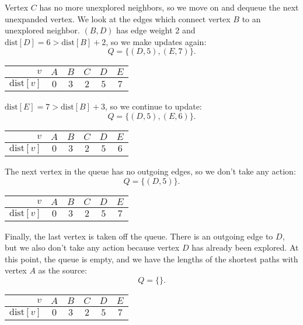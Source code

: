 \documentclass[11pt]{article}
\begin{document}
Vertex $C$ has no more unexplored neighbors, so we move on and dequeue the next unexpanded vertex. We look at the edges which connect vertex $B$ to an unexplored neighbor. $(B, D)$ has edge weight $2$ and $\text{dist}[D] = 6 > \text{dist}[B] + 2$, so we make updates again:
\begin{equation*}
    Q = \{(D, 5), (E, 7)\}.
\end{equation*}
\begin{center}
    \begin{tabular}{|r|ccccc|}
        \hline 
        $v$ & $A$ & $B$ & $C$ & $D$ & $E$ \\ \hline 
        $\text{dist}[v]$ & $0$ & $3$ & $2$ & $5$ & $7$ \\ \hline 
    \end{tabular}
\end{center}

$\text{dist}[E] = 7 > \text{dist}[B] + 3$, so we continue to update: 
\begin{equation*}
    Q = \{ (D, 5), (E, 6)\}.
\end{equation*}
\begin{center}
    \begin{tabular}{|r|ccccc|}
        \hline 
        $v$ & $A$ & $B$ & $C$ & $D$ & $E$ \\ \hline 
        $\text{dist}[v]$ & $0$ & $3$ & $2$ & $5$ & $6$ \\ \hline 
    \end{tabular}
\end{center}
The next vertex in the queue has no outgoing edges, so we don't take any action:
\begin{equation*}
    Q = \{ (D, 5)\}.
\end{equation*}
\begin{center}
    \begin{tabular}{|r|ccccc|}
        \hline 
        $v$ & $A$ & $B$ & $C$ & $D$ & $E$ \\ \hline 
        $\text{dist}[v]$ & $0$ & $3$ & $2$ & $5$ & $7$ \\ \hline 
    \end{tabular}
\end{center}
Finally, the last vertex is taken off the queue. There is an outgoing edge to $D$, but we also don't take any action because vertex $D$ has already been explored. At this point, the queue is empty, and we have the lengths of the shortest paths with vertex $A$ as the source:
\begin{equation*}
    Q = \{\}.
\end{equation*}
\begin{center}
    \begin{tabular}{|r|ccccc|}
        \hline 
        $v$ & $A$ & $B$ & $C$ & $D$ & $E$ \\ \hline 
        $\text{dist}[v]$ & $0$ & $3$ & $2$ & $5$ & $7$ \\ \hline 
    \end{tabular}
\end{center}
\end{document}
